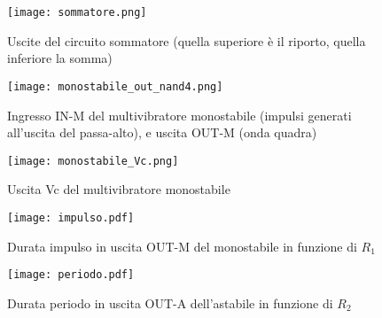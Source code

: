 \begin{figure}[h]
	\centering
	\texttt{[image: sommatore.png]}
	\caption{Uscite del circuito sommatore (quella superiore è il riporto, quella inferiore la somma)}
	\label{f:Sommatore}
\end{figure}
\begin{figure}[h]
	\centering
	\texttt{[image: monostabile\_out\_nand4.png]}
	\caption{Ingresso IN-M del multivibratore monostabile (impulsi generati all'uscita del passa-alto), e uscita OUT-M (onda quadra) }
	\label{f:monostabile_out_nand4}
\end{figure}
\begin{figure}[h]
	\centering
	\texttt{[image: monostabile\_Vc.png]}
	\caption{Uscita Vc del multivibratore monostabile}
	\label{f:monostabile_Vc}
\end{figure}
\begin{figure}[h]
	\centering
	\texttt{[image: impulso.pdf]}
	\caption{Durata impulso in uscita OUT-M del monostabile in funzione di $R_{1}$}
	\label{f:impulso}
\end{figure}
\begin{figure}[h]
	\centering
	\texttt{[image: periodo.pdf]}
	\caption{Durata periodo in uscita OUT-A dell'astabile in funzione di $R_{2}$}
	\label{f:periodo}
\end{figure}
